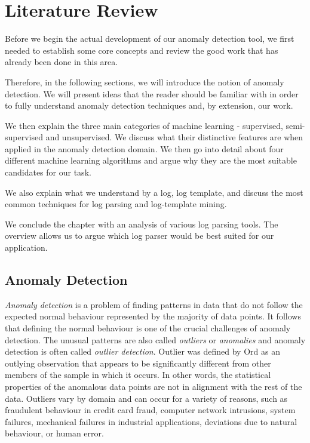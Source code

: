 \chapter{Literature Review}
\label{chapter:literatureReview}

Before we begin the actual development of our anomaly detection tool, we first needed to establish some core concepts and review the good work that has already been done in this area.

Therefore, in the following sections, we will introduce the notion of anomaly detection. We will present ideas that the reader should be familiar with in order to fully understand anomaly detection techniques and, by extension, our work.

We then explain the three main categories of machine learning - supervised, semi-supervised and unsupervised. We discuss what their distinctive features are when applied in the anomaly detection domain. 
We then go into detail about four different machine learning algorithms and argue why they are the most suitable candidates for our task.

We also explain what we understand by a log, log template, and discuss the most common techniques for log parsing and log-template mining.

We conclude the chapter with an analysis of various log parsing tools. The overview allows us to argue which log parser would be best suited for our application.

\section{Anomaly Detection}
\label{section:anomalyDetectionLiteratureReview}

\textit{Anomaly detection} is a problem of finding patterns in data that do not follow the expected normal behaviour represented by the majority of data points. It follows that defining the normal behaviour is one of the crucial challenges of anomaly detection. 
The unusual patterns are also called \textit{outliers} or \textit{anomalies} and anomaly detection is often called \textit{outlier detection}. 
Outlier was defined by Ord \cite{ORD1996175} as an outlying observation that appears to be significantly different from other members of the sample in which it occurs. 
In other words, the statistical properties of the anomalous data points are not in alignment with the rest of the data. 
Outliers vary by domain and can occur for a variety of reasons, such as fraudulent behaviour in credit card fraud, computer network intrusions, system failures, mechanical failures in industrial applications, deviations due to natural behaviour, or human error. 


